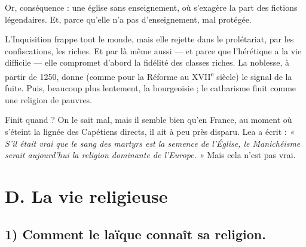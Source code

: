 \documentclass[french,twoside]{book} %
\begin{document}
Or, conséquence : une église sans enseignement, où s’exagère la part des fictions légendaires. Et, parce qu’elle n’a pas d’enseignement, mal protégée.\par
L’Inquisition frappe tout le monde, mais elle rejette dans le prolétariat, par les confiscations, les riches. Et par là même aussi — et parce que l’hérétique a la vie difficile — elle compromet d’abord la fidélité des classes riches. La noblesse, à partir de 1250, donne (comme pour la Réforme au XVII\textsuperscript{e} siècle) le signal de la fuite. Puis, beaucoup plus lentement, la bourgeoisie ; le catharisme finit comme une religion de pauvres.\par
Finit quand ? On le sait mal, mais il semble bien qu’en France, au moment où s’éteint la lignée des Capétiens directs, il ait à peu près disparu. Lea a écrit : \emph{« S’il était vrai que le sang des martyrs est la semence de l’Église, le Manichéisme serait aujourd’hui la religion dominante de l’Europe. »} Mais cela n’est pas vrai.
\label{p109}\section[D. La vie religieuse]{D. La vie religieuse}
\label{c10d}
\subsection[1) Comment le laïque connaît sa religion.]{1) Comment le laïque connaît sa religion.}
\end{document}
